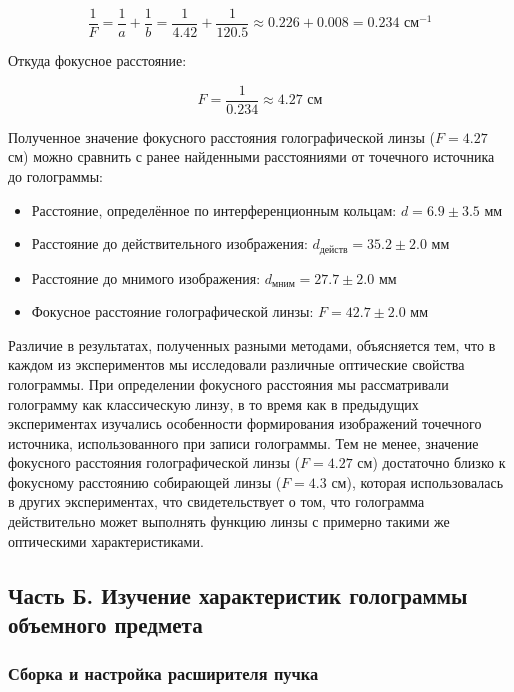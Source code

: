 \begin{equation}
    \frac{1}{F} = \frac{1}{a} + \frac{1}{b} = \frac{1}{4.42} + \frac{1}{120.5} \approx 0.226 + 0.008 = 0.234 \text{ см}^{-1}
\end{equation}

Откуда фокусное расстояние:

\begin{equation}
    F = \frac{1}{0.234} \approx 4.27 \text{ см}
\end{equation}

Полученное значение фокусного расстояния голографической линзы ($F = 4.27$ см) можно сравнить с ранее найденными расстояниями от точечного источника до голограммы:

\begin{itemize}
    \item Расстояние, определённое по интерференционным кольцам: $d = 6.9 \pm 3.5$ мм
    \item Расстояние до действительного изображения: $d_{\text{действ}} = 35.2 \pm 2.0$ мм
    \item Расстояние до мнимого изображения: $d_{\text{мним}} = 27.7 \pm 2.0$ мм
    \item Фокусное расстояние голографической линзы: $F = 42.7 \pm 2.0$ мм
\end{itemize}

Различие в результатах, полученных разными методами, объясняется тем, что в каждом из экспериментов мы исследовали различные оптические свойства голограммы. При определении фокусного расстояния мы рассматривали голограмму как классическую линзу, в то время как в предыдущих экспериментах изучались особенности формирования изображений точечного источника, использованного при записи голограммы. Тем не менее, значение фокусного расстояния голографической линзы ($F = 4.27$ см) достаточно близко к фокусному расстоянию собирающей линзы ($F = 4.3$ см), которая использовалась в других экспериментах, что свидетельствует о том, что голограмма действительно может выполнять функцию линзы с примерно такими же оптическими характеристиками.

\subsection{Часть Б. Изучение характеристик голограммы объемного предмета}

\subsubsection{Сборка и настройка расширителя пучка}

